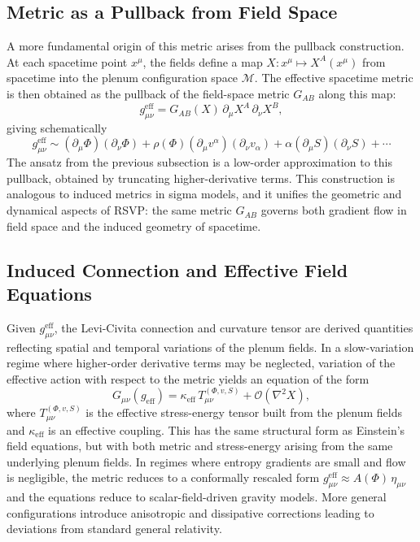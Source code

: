 \documentclass[12pt,a4paper]{article}
\theoremstyle{plain}
\theoremstyle{definition}
\theoremstyle{remark}
\begin{document}
\subsection{Metric as a Pullback from Field Space}

A more fundamental origin of this metric arises from the pullback
construction. At each spacetime point $x^\mu$, the fields define a
map $X : x^\mu \mapsto X^A(x^\mu)$ from spacetime into the plenum
configuration space $\mathcal{M}$. The effective spacetime metric is
then obtained as the pullback of the field-space metric $G_{AB}$
along this map:
\begin{equation}
g_{\mu\nu}^{\mathrm{eff}} =
G_{AB}(X)\,\partial_\mu X^A\,\partial_\nu X^B,
\end{equation}
giving schematically
\begin{equation}
g_{\mu\nu}^{\mathrm{eff}} \sim
(\partial_\mu\Phi)(\partial_\nu\Phi)
+ \rho(\Phi)(\partial_\mu v^\alpha)(\partial_\nu v_\alpha)
+ \alpha(\partial_\mu S)(\partial_\nu S) + \cdots
\end{equation}
The ansatz from the previous subsection is a low-order approximation
to this pullback, obtained by truncating higher-derivative terms. This
construction is analogous to induced metrics in sigma models, and it
unifies the geometric and dynamical aspects of RSVP: the same metric
$G_{AB}$ governs both gradient flow in field space and the induced
geometry of spacetime.

\subsection{Induced Connection and Effective Field Equations}

Given $g_{\mu\nu}^{\mathrm{eff}}$, the Levi-Civita connection and
curvature tensor are derived quantities reflecting spatial and temporal
variations of the plenum fields. In a slow-variation regime where
higher-order derivative terms may be neglected, variation of the
effective action with respect to the metric yields an equation of the
form
\begin{equation}
G_{\mu\nu}(g_{\mathrm{eff}}) =
\kappa_{\mathrm{eff}}\,T_{\mu\nu}^{(\Phi,v,S)}
+ \mathcal{O}(\nabla^2 X),
\end{equation}
where $T_{\mu\nu}^{(\Phi,v,S)}$ is the effective stress-energy tensor
built from the plenum fields and $\kappa_{\mathrm{eff}}$ is an
effective coupling. This has the same structural form as Einstein's
field equations, but with both metric and stress-energy arising from
the same underlying plenum fields. In regimes where entropy gradients
are small and flow is negligible, the metric reduces to a conformally
rescaled form $g_{\mu\nu}^{\mathrm{eff}} \approx A(\Phi)\,\eta_{\mu\nu}$
and the equations reduce to scalar-field-driven gravity models. More
general configurations introduce anisotropic and dissipative
corrections leading to deviations from standard general relativity.
\end{document}
